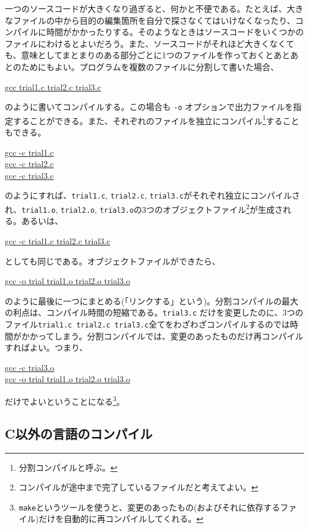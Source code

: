 一つのソースコードが大きくなり過ぎると、何かと不便である。たとえば、大きなファイルの中から目的の編集箇所を自分で探さなくてはいけなくなったり、コンパイルに時間がかかったりする。そのようなときはソースコードをいくつかのファイルにわけるとよいだろう。また、ソースコードがそれほど大きくなくても、意味としてまとまりのある部分ごとに1つのファイルを作っておくとあとあとのためにもよい。プログラムを複数のファイルに分割して書いた場合、
\begin{commandline2}
\prompt \underline{gcc trial1.c trial2.c trial3.c}
\end{commandline2} \noindent
のように書いてコンパイルする。この場合も {\tt -o} オプションで出力ファイルを指定することができる。また、それぞれのファイルを独立にコンパイル\footnote{分割コンパイルと呼ぶ。}することもできる。
\begin{commandline2}
\prompt \underline{gcc -c trial1.c} \\
\prompt \underline{gcc -c trial2.c} \\
\prompt \underline{gcc -c trial3.c}
\end{commandline2} \noindent
のようにすれば、{\tt trial1.c}, {\tt trial2.c}, {\tt trial3.c}がそれぞれ独立にコンパイルされ、{\tt trial1.o}, {\tt trial2.o}, {\tt trial3.o}の3つのオブジェクトファイル\footnote{コンパイルが途中まで完了しているファイルだと考えてよい。}が生成される。あるいは、
\begin{commandline2}
\prompt \underline{gcc -c trial1.c trial2.c trial3.c}
\end{commandline2} \noindent
としても同じである。オブジェクトファイルができたら、
\begin{commandline2}
\prompt \underline{gcc -o trial trial1.o trial2.o trial3.o}
\end{commandline2} \noindent
のように最後に一つにまとめる(「リンクする」という)。分割コンパイルの最大の利点は、コンパイル時間の短縮である。{\tt trial3.c} だけを変更したのに、3つのファイル{\tt trial1.c trial2.c trial3.c}全てをわざわざコンパイルするのでは時間がかかってしまう。分割コンパイルでは、変更のあったものだけ再コンパイルすればよい。つまり、
\begin{commandline2}
\prompt \underline{gcc -c trial3.o} \\
\prompt \underline{gcc -o trial trial1.o trial2.o trial3.o}
\end{commandline2} \noindent
だけでよいということになる\footnote{{\tt make}というツールを使うと、変更のあったもの(およびそれに依存するファイル)だけを自動的に再コンパイルしてくれる。}。

\subsection{C以外の言語のコンパイル}


